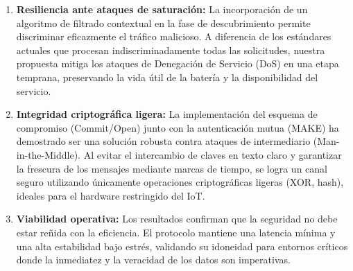 \documentclass[conference,a4paper,onecolumn,11pt]{IEEEtran} %
\begin{document}
\begin{enumerate}
    \item \textbf{Resiliencia ante ataques de saturación:} La incorporación de un algoritmo de filtrado contextual en la fase de descubrimiento permite discriminar eficazmente el tráfico malicioso. A diferencia de los estándares actuales que procesan indiscriminadamente todas las solicitudes, nuestra propuesta mitiga los ataques de Denegación de Servicio (DoS) en una etapa temprana,\cite{hadiks2014dos} preservando la vida útil de la batería y la disponibilidad del servicio.
    
    \item \textbf{Integridad criptográfica ligera:} La implementación del esquema de compromiso (Commit/Open) junto con la autenticación mutua (MAKE) ha demostrado ser una solución robusta contra ataques de intermediario (Man-in-the-Middle).\cite{gaba2021secure} Al evitar el intercambio de claves en texto claro y garantizar la frescura de los mensajes mediante marcas de tiempo, se logra un canal seguro utilizando únicamente operaciones criptográficas ligeras (XOR, hash), ideales para el hardware restringido del IoT.
    
    \item \textbf{Viabilidad operativa:} Los resultados confirman que la seguridad no debe estar reñida con la eficiencia. El protocolo mantiene una latencia mínima y una alta estabilidad bajo estrés, validando su idoneidad para entornos críticos donde la inmediatez y la veracidad de los datos son imperativas.
\end{enumerate}
\end{document}
